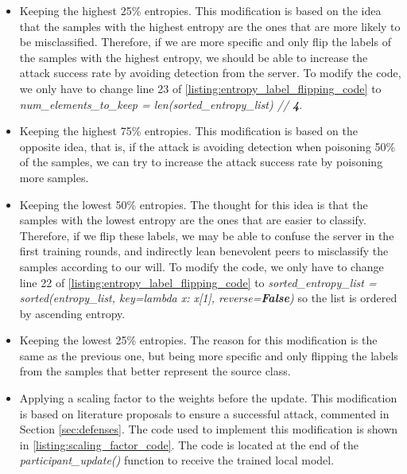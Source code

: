 \begin{itemize}
        \item Keeping the highest 25\% entropies. This modification is based on the idea that the samples with the highest entropy are the ones that are more likely to be misclassified. Therefore, if we are more specific and only flip the labels of the samples with the highest entropy, we should be able to increase the attack success rate by avoiding detection from the server. To modify the code, we only have to change line 23 of \autoref{listing:entropy_label_flipping_code} to \textit{num\_elements\_to\_keep = len(sorted\_entropy\_list) // \textbf{4}}.
        \item Keeping the highest 75\% entropies. This modification is based on the opposite idea, that is, if the attack is avoiding detection when poisoning 50\% of the samples, we can try to increase the attack success rate by poisoning more samples.
        \item Keeping the lowest 50\% entropies. The thought for this idea is that the samples with the lowest entropy are the ones that are easier to classify. Therefore, if we flip these labels, we may be able to confuse the server in the first training rounds, and indirectly lean benevolent peers to misclassify the samples according to our will. To modify the code, we only have to change line 22 of \autoref{listing:entropy_label_flipping_code} to \textit{sorted\_entropy\_list = sorted(entropy\_list, key=lambda x: x[1], reverse=\textbf{False})} so the list is ordered by ascending entropy.
        \item Keeping the lowest 25\% entropies. The reason for this modification is the same as the previous one, but being more specific and only flipping the labels from the samples that better represent the source class.
        \item Applying a scaling factor to the weights before the update. This modification is based on literature proposals to ensure a successful attack, commented in Section \ref{sec:defenses}. The code used to implement this modification is shown in \autoref{listing:scaling_factor_code}. The code is located at the end of the \textit{participant\_update()} function to receive the trained local model.
\end{itemize}

